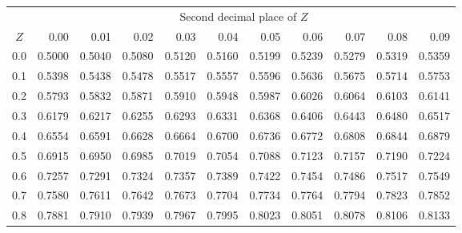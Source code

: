 \begin{table}[H]
\begin{center}
{\begin{tabular}{c | rrrrr | rrrrr |}
  \cline{2-11}
&&&& \multicolumn{4}{c}{Second decimal place of $Z$} &&& \\
  \cline{2-11}
$Z$ & 0.00 & 0.01 & 0.02 & 0.03 & 0.04 & 0.05 & 0.06 & 0.07 & 0.08 & 0.09 \\
  \hline
  \hline
0.0 & \normalsize{0.5000} & \normalsize{0.5040} & \normalsize{0.5080} & \normalsize{0.5120} & \normalsize{0.5160} & \normalsize{0.5199} & \normalsize{0.5239} & \normalsize{0.5279} & \normalsize{0.5319} & \normalsize{0.5359} \\
  0.1 & \normalsize{0.5398} & \normalsize{0.5438} & \normalsize{0.5478} & \normalsize{0.5517} & \normalsize{0.5557} & \normalsize{0.5596} & \normalsize{0.5636} & \normalsize{0.5675} & \normalsize{0.5714} & \normalsize{0.5753} \\
  0.2 & \normalsize{0.5793} & \normalsize{0.5832} & \normalsize{0.5871} & \normalsize{0.5910} & \normalsize{0.5948} & \normalsize{0.5987} & \normalsize{0.6026} & \normalsize{0.6064} & \normalsize{0.6103} & \normalsize{0.6141} \\
  0.3 & \normalsize{0.6179} & \normalsize{0.6217} & \normalsize{0.6255} & \normalsize{0.6293} & \normalsize{0.6331} & \normalsize{0.6368} & \normalsize{0.6406} & \normalsize{0.6443} & \normalsize{0.6480} & \normalsize{0.6517} \\
  0.4 & \normalsize{0.6554} & \normalsize{0.6591} & \normalsize{0.6628} & \normalsize{0.6664} & \normalsize{0.6700} & \normalsize{0.6736} & \normalsize{0.6772} & \normalsize{0.6808} & \normalsize{0.6844} & \normalsize{0.6879} \\
  \hline
  0.5 & \normalsize{0.6915} & \normalsize{0.6950} & \normalsize{0.6985} & \normalsize{0.7019} & \normalsize{0.7054} & \normalsize{0.7088} & \normalsize{0.7123} & \normalsize{0.7157} & \normalsize{0.7190} & \normalsize{0.7224} \\
  0.6 & \normalsize{0.7257} & \normalsize{0.7291} & \normalsize{0.7324} & \normalsize{0.7357} & \normalsize{0.7389} & \normalsize{0.7422} & \normalsize{0.7454} & \normalsize{0.7486} & \normalsize{0.7517} & \normalsize{0.7549} \\
  0.7 & \normalsize{0.7580} & \normalsize{0.7611} & \normalsize{0.7642} & \normalsize{0.7673} & \normalsize{0.7704} & \normalsize{0.7734} & \normalsize{0.7764} & \normalsize{0.7794} & \normalsize{0.7823} & \normalsize{0.7852} \\
  0.8 & \normalsize{0.7881} & \normalsize{0.7910} & \normalsize{0.7939} & \normalsize{0.7967} & \normalsize{0.7995} & \normalsize{0.8023} & \normalsize{0.8051} & \normalsize{0.8078} & \normalsize{0.8106} & \normalsize{0.8133} \\

\end{tabular}}
\end{center}
\end{table}
